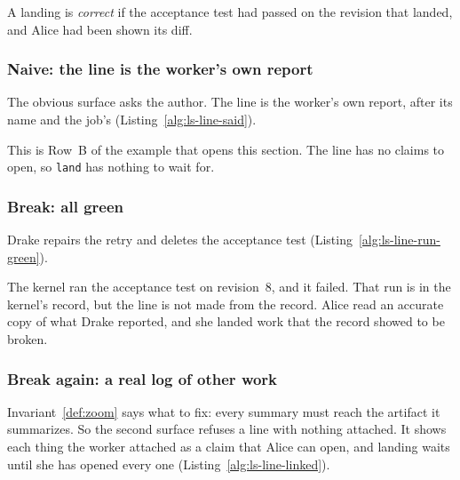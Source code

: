 A landing is \emph{correct} if the acceptance test had passed on the
revision that landed, and Alice had been shown its diff.

\subsubsection{Naive: the line is the worker's own report}

The obvious surface asks the author. The line is the worker's own report,
after its name and the job's (Listing~\ref{alg:ls-line-said}).


This is Row~B of the example that opens this section. The line has no
claims to open, so \texttt{land} has nothing to wait for.

\subsubsection{Break: all green}

Drake repairs the retry and deletes the acceptance test
(Listing~\ref{alg:ls-line-run-green}).


The kernel ran the acceptance test on revision~8, and it failed. That run
is in the kernel's record, but the line is not made from the record. Alice
read an accurate copy of what Drake reported, and she landed work that the
record showed to be broken.

\subsubsection{Break again: a real log of other work}

Invariant~\ref{def:zoom} says what to fix: every summary must reach the
artifact it summarizes. So the second surface refuses a line with nothing
attached. It shows each thing the worker attached as a claim that Alice can
open, and landing waits until she has opened every one
(Listing~\ref{alg:ls-line-linked}).


